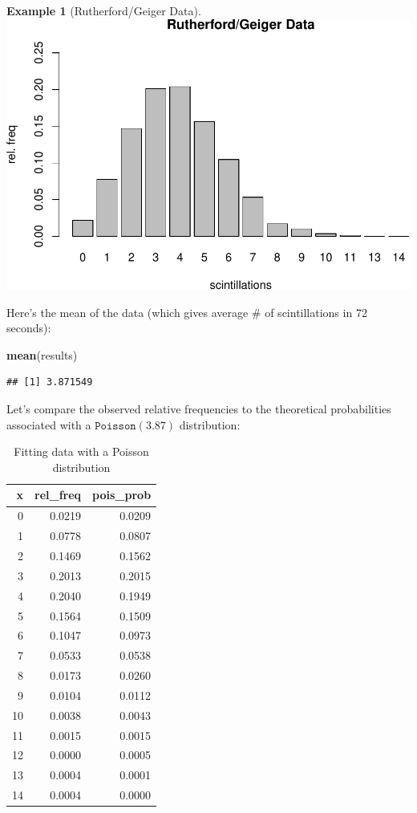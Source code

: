 \documentclass[
]{book}
\newenvironment{Shaded}{\begin{snugshade}}{\end{snugshade}}
\newcommand{\FunctionTok}[1]{\textcolor[rgb]{0.13,0.29,0.53}{\textbf{#1}}}
\newcommand{\NormalTok}[1]{#1}
\theoremstyle{definition}
\theoremstyle{definition}
\newtheorem{example}{Example}[chapter]
\theoremstyle{definition}
\theoremstyle{definition}
\theoremstyle{remark}
\begin{document}
\begin{example}[Rutherford/Geiger Data]
\includegraphics{math340-notes_files/figure-latex/unnamed-chunk-152-1.pdf}

Here's the mean of the data (which gives average \# of scintillations in 72 seconds):

\begin{Shaded}
\begin{Highlighting}[]
\FunctionTok{mean}\NormalTok{(results)}
\end{Highlighting}
\end{Shaded}

\begin{verbatim}
## [1] 3.871549
\end{verbatim}

Let's compare the observed relative frequencies to the theoretical probabilities associated with a \(\texttt{Poisson}(3.87)\) distribution:

\begin{table}
\centering
\caption{\label{tab:unnamed-chunk-154}Fitting data with a Poisson distribution}
\centering
\begin{tabular}[t]{r|r|r}
\hline
x & rel\_freq & pois\_prob\\
\hline
0 & 0.0219 & 0.0209\\
\hline
1 & 0.0778 & 0.0807\\
\hline
2 & 0.1469 & 0.1562\\
\hline
3 & 0.2013 & 0.2015\\
\hline
4 & 0.2040 & 0.1949\\
\hline
5 & 0.1564 & 0.1509\\
\hline
6 & 0.1047 & 0.0973\\
\hline
7 & 0.0533 & 0.0538\\
\hline
8 & 0.0173 & 0.0260\\
\hline
9 & 0.0104 & 0.0112\\
\hline
10 & 0.0038 & 0.0043\\
\hline
11 & 0.0015 & 0.0015\\
\hline
12 & 0.0000 & 0.0005\\
\hline
13 & 0.0004 & 0.0001\\
\hline
14 & 0.0004 & 0.0000\\
\hline
\end{tabular}
\end{table}


\end{example}
\end{document}
